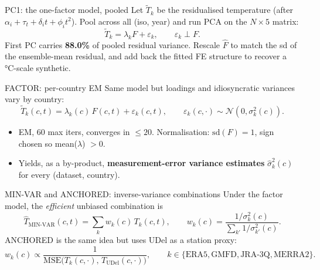 \documentclass[10pt,aspectratio=169]{beamer}
\begin{document}
\begin{frame}{PC1: the one-factor model, pooled}
  Let $\tilde T_k$ be the residualised temperature (after
  $\alpha_i + \tau_t + \delta_i t + \phi_i t^2$). Pool across all
  (iso, year) and run PCA on the $N \times 5$ matrix:
  \[
  \tilde T_k = \lambda_k F + \varepsilon_k, \qquad \varepsilon_k \perp F.
  \]
  First PC carries \textbf{88.0\%} of pooled residual variance. Rescale
  $\hat F$ to match the sd of the ensemble-mean residual, and add back the
  fitted FE structure to recover a °C-scale synthetic.
\end{frame}

\begin{frame}{FACTOR: per-country EM}
  Same model but loadings and idiosyncratic variances vary by country:
  \[
  \tilde T_k(c, t) = \lambda_k(c)\,F(c, t) + \varepsilon_k(c, t),
  \qquad \varepsilon_k(c,\cdot) \sim \mathcal{N}(0, \sigma_k^2(c)).
  \]
  \vspace{-0.5em}
  \begin{itemize}
    \item EM, 60 max iters, converges in $\leq 20$. Normalisation:
          $\text{sd}(F) = 1$, sign chosen so mean($\lambda$) $> 0$.
    \item Yields, as a by-product, \textbf{measurement-error variance
          estimates} $\hat\sigma_k^2(c)$ for every (dataset, country).
  \end{itemize}
\end{frame}

\begin{frame}{MIN-VAR and ANCHORED: inverse-variance combinations}
  Under the factor model, the \emph{efficient} unbiased combination is
  \[
    \hat T_{\text{MIN-VAR}}(c, t)
    = \sum_k w_k(c)\, T_k(c, t), \qquad
    w_k(c) = \frac{1/\sigma_k^2(c)}{\sum_{k'} 1/\sigma_{k'}^2(c)}.
  \]
  ANCHORED is the same idea but uses UDel as a station proxy:
  \[
  w_k(c) \propto \frac{1}{\text{MSE}\bigl(T_k(c,\cdot),\, T_{\text{UDel}}(c,\cdot)\bigr)},
  \qquad k \in \{\text{ERA5},\text{GMFD},\text{JRA-3Q},\text{MERRA2}\}.
  \]
\end{frame}
\end{document}
